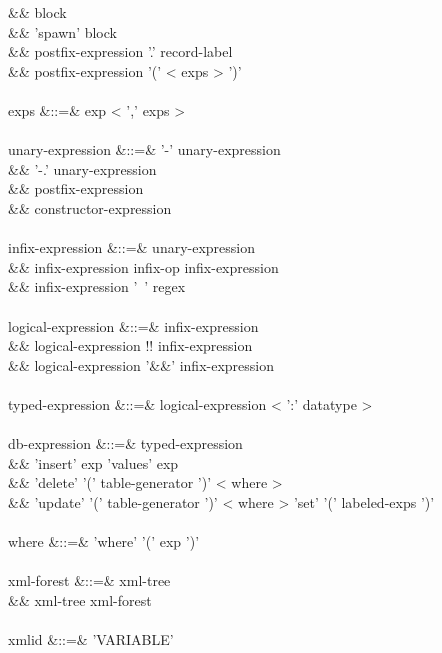 \documentclass[11pt,a4paper]{article}
\begin{document}
\begin{grammar}
&&                        block \\
&&                        'spawn' block \\
&&                        postfix-expression '.' record-label \\
&&                        postfix-expression '(' < exps > ')' \\
\\
exps &::=& exp < ',' exps >  \\
\\
unary-expression &::=& '-' unary-expression \\
&&                     '-.' unary-expression \\
&&                     postfix-expression \\
&&                     constructor-expression \\
\\
infix-expression &::=& unary-expression \\
&&                     infix-expression infix-op infix-expression \\
&&                     infix-expression '~' regex \\
\\
logical-expression &::=& infix-expression \\
&&                       logical-expression !! infix-expression \\
&&                       logical-expression '&&' infix-expression \\
\\
typed-expression &::=& logical-expression < ':' datatype > \\
\\
db-expression &::=& typed-expression \\
&&                  'insert' exp 'values' exp \\
&&                  'delete' '(' table-generator ')' < where >  \\
&&                  'update' '(' table-generator ')' < where > 'set' '(' labeled-exps ')' \\
\\
where &::=& 'where' '(' exp ')' \\
\\
xml-forest &::=& xml-tree \\
&&               xml-tree xml-forest \\
\\
xmlid &::=& 'VARIABLE' \\
\\

\end{grammar}
\end{document}
